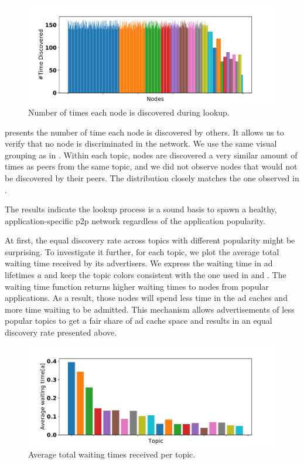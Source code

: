 \begin{figure}
\centering
\includegraphics[width=\linewidth]{results/testbed/testbed_times_discovered.pdf}
\caption{\label{fig:testbed_time_discovered}Number of times each node is discovered during lookup.}
\vspace{-0.15in}
\end{figure}

 presents the number of time each node is discovered by others. 
It allows us to verify that no node is discriminated in the network.
We use the same visual grouping as in .
Within each topic, nodes are discovered a very similar amount of times as peers from the same topic, and we did not observe nodes that would not be discovered by their peers. 
The distribution closely matches the one observed in . 

The results indicate the \sysname lookup process is a sound basis to spawn a healthy, application-specific p2p network regardless of the application popularity.

At first, the equal discovery rate across topics with different popularity might be surprising.
To investigate it further, for each topic, we plot the average total waiting time received by its advertisers.
We express the waiting time in ad lifetimes $a$ and keep the topic colors consistent with the one used in  and .
The waiting time function returns higher waiting times to nodes from popular applications.
As a result, those nodes will spend less time in the ad caches and more time waiting to be admitted.
This mechanism allows advertisements of less popular topics to get a fair share of ad cache space and results in an equal discovery rate presented above. 

\begin{figure}
\centering
\includegraphics[width=\linewidth]{results/testbed/waiting_time.pdf}
\caption{Average total waiting times received per topic.}
\label{fig:testbed_waiting_time}
\vspace{-0.15in}
\end{figure}

